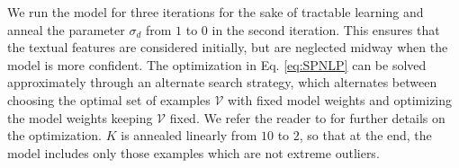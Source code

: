 \documentclass[10pt,twocolumn,letterpaper]{article}
\begin{document}
We run the model for three iterations for the sake of tractable learning and anneal the parameter $\sigma_d$ from $1$ to $0$ in the second iteration. This ensures that the textual features are considered initially, but are neglected midway when the model is more confident. The optimization in Eq. \ref{eq:SPNLP} can be solved approximately through an alternate search strategy, which alternates between choosing the optimal set of examples $\mathcal{V}$ with fixed model weights and optimizing the model weights keeping $\mathcal{V}$ fixed. We refer the reader to \cite{Kumar_NIPS10} for further details on the optimization. $K$ is annealed linearly from $10$ to $2$, so that at the end, the model includes only those examples which are not extreme outliers.

{\small


}
\end{document}
